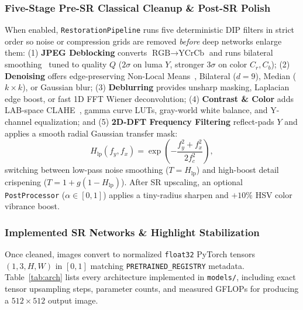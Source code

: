 \documentclass[10pt,onecolumn,journal]{IEEEtran}
\begin{document}
\subsubsection{Five-Stage Pre-SR Classical Cleanup \& Post-SR Polish}
When enabled, \texttt{RestorationPipeline} runs five deterministic DIP filters in strict order so noise or compression grids are removed \textit{before} deep networks enlarge them: (1) \textbf{JPEG Deblocking} converts $\text{RGB} \to \text{YCrCb}$ and runs bilateral smoothing~\cite{tomasi1998bilateral} tuned to quality $Q$ ($2\sigma$ on luma $Y$, stronger $3\sigma$ on color $C_r, C_b$); (2) \textbf{Denoising} offers edge-preserving Non-Local Means~\cite{buades2005nlm}, Bilateral ($d=9$), Median ($k\times k$), or Gaussian blur; (3) \textbf{Deblurring} provides unsharp masking, Laplacian edge boost, or fast 1D FFT Wiener deconvolution; (4) \textbf{Contrast \& Color} adds LAB-space CLAHE~\cite{zuiderveld1994clahe}, gamma curve LUTs, gray-world white balance, and Y-channel equalization; and (5) \textbf{2D-DFT Frequency Filtering} reflect-pads $Y$ and applies a smooth radial Gaussian transfer mask:
\begin{equation}
H_{\mathrm{lp}}(f_y, f_x) = \exp\!\left(-\frac{f_y^2 + f_x^2}{2f_c^2}\right),
\label{eq:freq}
\end{equation}
switching between low-pass noise smoothing ($T = H_{\mathrm{lp}}$) and high-boost detail crispening ($T = 1 + g(1 - H_{\mathrm{lp}})$). After SR upscaling, an optional \texttt{PostProcessor} ($\alpha \in [0, 1]$) applies a tiny-radius sharpen and $+10\%$ HSV color vibrance boost.

\subsubsection{Implemented SR Networks \& Highlight Stabilization}
Once cleaned, images convert to normalized \texttt{float32} PyTorch tensors $(1, 3, H, W)$ in $[0, 1]$ matching \texttt{PRETRAINED\_REGISTRY} metadata. Table~\ref{tab:arch} lists every architecture implemented in \texttt{models/}, including exact tensor upsampling steps, parameter counts, and measured GFLOPs for producing a $512\times512$ output image.
\end{document}
